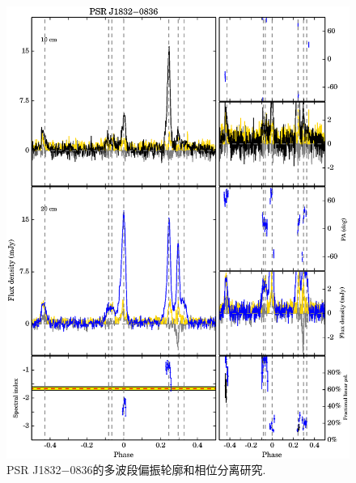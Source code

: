 \begin{figure}
\begin{center}
\includegraphics[width=6 in]{1832.ps}
\caption{PSR J1832$-$0836的多波段偏振轮廓和相位分离研究.}
\label{1832}
\end{center}
\end{figure}

